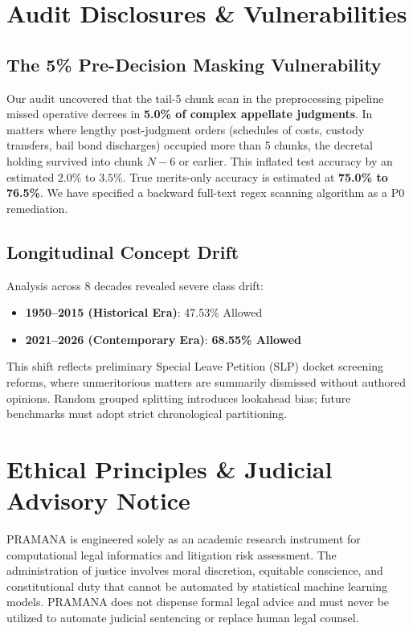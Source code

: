 \documentclass[journal,10pt,twocolumn]{IEEEtran}
\begin{document}
\section{Audit Disclosures & Vulnerabilities}
\subsection{The 5\% Pre-Decision Masking Vulnerability}
Our audit uncovered that the tail-5 chunk scan in the preprocessing pipeline missed operative decrees in \textbf{5.0\% of complex appellate judgments}. In matters where lengthy post-judgment orders (schedules of costs, custody transfers, bail bond discharges) occupied more than 5 chunks, the decretal holding survived into chunk $N-6$ or earlier. This inflated test accuracy by an estimated $2.0\%$ to $3.5\%$. True merits-only accuracy is estimated at \textbf{75.0\% to 76.5\%}. We have specified a backward full-text regex scanning algorithm as a P0 remediation.

\subsection{Longitudinal Concept Drift}
Analysis across 8 decades revealed severe class drift:
\begin{itemize}
    \item \textbf{1950--2015 (Historical Era)}: 47.53\% Allowed
    \item \textbf{2021--2026 (Contemporary Era)}: \textbf{68.55\% Allowed}
\end{itemize}
This shift reflects preliminary Special Leave Petition (SLP) docket screening reforms, where unmeritorious matters are summarily dismissed without authored opinions. Random grouped splitting introduces lookahead bias; future benchmarks must adopt strict chronological partitioning.

\section{Ethical Principles & Judicial Advisory Notice}
PRAMANA is engineered solely as an academic research instrument for computational legal informatics and litigation risk assessment. The administration of justice involves moral discretion, equitable conscience, and constitutional duty that cannot be automated by statistical machine learning models. PRAMANA does not dispense formal legal advice and must never be utilized to automate judicial sentencing or replace human legal counsel.
\end{document}
